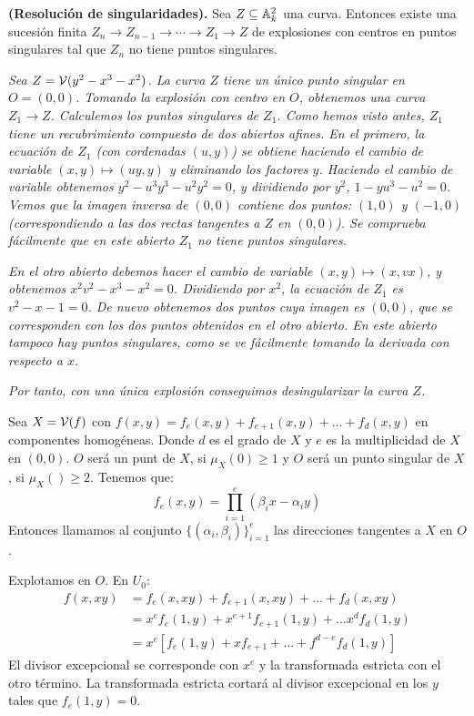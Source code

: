 \documentclass[ACGA.tex]{subfiles}
\begin{document}
\begin{teorema} {\bf (Resolución de singularidades).} Sea $Z\subseteq\mathbb{A}^2_k$ una curva. Entonces existe una sucesión finita $Z_n\to Z_{n-1}\to \cdots\to Z_1\to Z$ de explosiones con centros en puntos singulares tal que $Z_n$ no tiene puntos singulares. 
 \end{teorema}

\begin{ejs}
\emph{ Sea $Z=\mathcal{V}(y^2-x^3-x^2)$. La curva $Z$ tiene un único punto singular en $O=(0,0)$. Tomando la explosión con centro en $O$, obtenemos una curva $Z_1\to Z$. Calculemos los puntos singulares de $Z_1$. Como hemos visto antes, $Z_1$ tiene un recubrimiento compuesto de dos abiertos afines. En el primero, la ecuación de $Z_1$ (con cordenadas $(u,y)$) se obtiene haciendo el cambio de variable $(x,y)\mapsto (uy,y)$ y eliminando los factores $y$. Haciendo el cambio de variable obtenemos $y^2-u^3y^3-u^2y^2=0$, y dividiendo por $y^2$, $1-yu^3-u^2=0$. Vemos que la imagen inversa de $(0,0)$ contiene dos puntos: $(1,0)$ y $(-1,0)$ (correspondiendo a las dos rectas tangentes a $Z$ en $(0,0)$). Se comprueba fácilmente que en este abierto $Z_1$ no tiene puntos singulares.}

\emph{En el otro abierto debemos hacer el cambio de variable $(x,y)\mapsto (x,vx)$, y obtenemos $x^2v^2-x^3-x^2=0$. Dividiendo por $x^2$, la ecuación de $Z_1$ es $v^2-x-1=0$. De nuevo obtenemos dos puntos cuya imagen es $(0,0)$, que se corresponden con los dos puntos obtenidos en el otro abierto. En este abierto tampoco hay puntos singulares, como se ve fácilmente tomando la derivada con respecto a $x$.}

\emph{Por tanto, con una única explosión conseguimos desingularizar la curva $Z$.}
\end{ejs}

Sea $X=\mathcal{V}(f)$ con $f(x,y) = f_e(x,y)+f_{e+1}(x,y)+\dots+f_d(x,y)$ en componentes homogéneas. Donde $d$ es el grado de $X$ y $e$ es la multiplicidad de $X$ en $(0,0)$. $O$ será un punt de $X$, si $μ_X(0) ≥ 1$ y $O$ será un punto singular de $X$, si $μ_X() ≥ 2$. Tenemos que:
\[ f_e(x,y) = \prod_{i=1}^e (β_i x - α_i y) \]
Entonces llamamos al conjunto $\{(α_i,β_i)\}_{i=1}^e$ las direcciones tangentes a $X$ en $O$.

Explotamos en $O$. En $U_0$:
\begin{align*}
	f(x,xy) & = f_e(x,xy) + f_{e+1}(x,xy) + \dots + f_d(x,xy) \\
	& = x^e f_e(1,y) + x^{e+1}f_{e+1}(1,y) + \dots x^d f_d(1,y) \\
	& = x^e \left[f_e(1,y)+xf_{e+1} + \dots + f^{d-e}f_d(1,y) \right]
\end{align*}
El divisor excepcional se corresponde con $x^e$ y la transformada estricta con el otro término. La transformada estricta cortará al divisor excepcional en los $y$ tales que $f_e(1,y)=0$.
\end{document}
